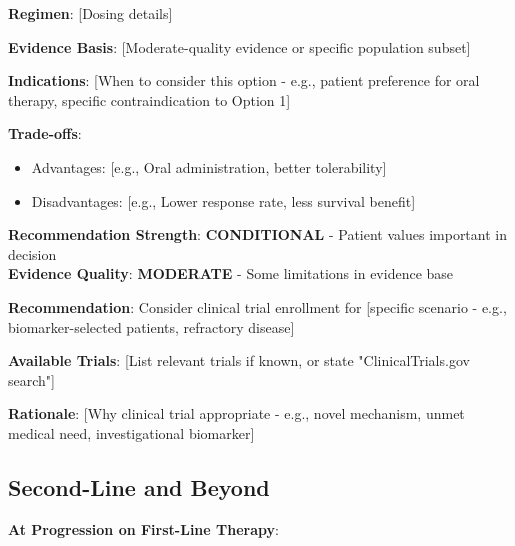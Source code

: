 \documentclass[10pt,letterpaper]{article}
\begin{document}
\vspace{3pt}

\begin{tcolorbox}[enhanced,colback=conditionalyellow!10,colframe=conditionalyellow,
title={\textbf{Option 2: [Alternative Regimen]} \hfill \colorbox{white}{\textbf{CONDITIONAL (2B)}}},
fonttitle=\bfseries\small,coltitle=black]
{\small
\textbf{Regimen}: [Dosing details]

\textbf{Evidence Basis}: [Moderate-quality evidence or specific population subset]

\textbf{Indications}: [When to consider this option - e.g., patient preference for oral therapy, specific contraindication to Option 1]

\textbf{Trade-offs}: 
\begin{itemize}
\item Advantages: [e.g., Oral administration, better tolerability]
\item Disadvantages: [e.g., Lower response rate, less survival benefit]
\end{itemize}

\textbf{Recommendation Strength}: \textbf{CONDITIONAL} - Patient values important in decision\\
\textbf{Evidence Quality}: \textbf{MODERATE} - Some limitations in evidence base
}
\end{tcolorbox}

\vspace{3pt}

\begin{tcolorbox}[enhanced,colback=researchblue!10,colframe=researchblue,
title={\textbf{Option 3: Clinical Trial} \hfill \colorbox{white}{\textbf{RESEARCH (R)}}},
fonttitle=\bfseries\small,coltitle=black]
{\small
\textbf{Recommendation}: Consider clinical trial enrollment for [specific scenario - e.g., biomarker-selected patients, refractory disease]

\textbf{Available Trials}: [List relevant trials if known, or state "ClinicalTrials.gov search"]

\textbf{Rationale}: [Why clinical trial appropriate - e.g., novel mechanism, unmet medical need, investigational biomarker]
}
\end{tcolorbox}

\subsection{Second-Line and Beyond}

\textbf{At Progression on First-Line Therapy}:
\end{document}
